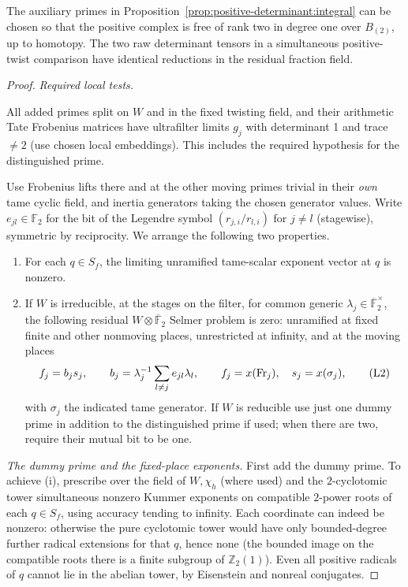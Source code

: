 \begin{lemma}\label{lem:positive-determinant:residual}
The auxiliary primes in Proposition~\ref{prop:positive-determinant:integral}
can be chosen so that the positive complex is free of rank two in degree one
over \(B_{(2)}\), up to homotopy. The two raw determinant tensors in a
simultaneous positive-twist comparison have identical reductions in the
residual fraction field.
\end{lemma}
\begin{proof}
\emph{Required local tests.}

All added primes split on \(W\) and in the fixed twisting field, and their arithmetic Tate Frobenius matrices have ultrafilter limits \(g_j\) with determinant 1 and trace \(\ne2\) (use chosen local embeddings). This includes the required hypothesis for the distinguished prime. 

Use Frobenius lifts there and at the other moving primes trivial in their \emph{own} tame cyclic field, and inertia generators taking the chosen generator values. Write \(e_{jl}\in\mathbb F_2\) for the bit of the Legendre symbol \((r_{j,i}/r_{l,i})\) for \(j\ne l\) (stagewise), symmetric by reciprocity. We arrange the following two properties.
\begin{enumerate}[label=(\roman*)]
\item For each \(q\in S_f\), the limiting unramified tame-scalar exponent vector at \(q\) is nonzero.
\item If \(W\) is irreducible, at the stages on the filter, for common generic \(\lambda_j\in\overline{\mathbb F}_2^\times\), the following residual \(W\otimes\overline{\mathbb F}_2\) Selmer problem is zero: unramified at fixed finite and other nonmoving places, unrestricted at infinity, and at the moving places
\[
             f_j=b_j s_j,\qquad b_j=\lambda_j^{-1}\sum_{l\ne j}e_{jl}\lambda_l ,
             \qquad f_j=x({\rm Fr}_j),\quad s_j=x(\sigma_j),       \tag{L2}\label{eq:L2}
\]
with \(\sigma_j\) the indicated tame generator. If \(W\) is reducible use just one dummy prime in addition to the distinguished prime if used; when there are two, require their mutual bit to be one.
\end{enumerate}

\emph{The dummy prime and the fixed-place exponents.}
First add the dummy prime. To achieve (i), prescribe over the field of \(W,\chi_h\) (where used) and the \(2\)-cyclotomic tower simultaneous nonzero Kummer exponents on compatible \(2\)-power roots of each \(q\in S_f\), using accuracy tending to infinity. Each coordinate can indeed be nonzero: otherwise the pure cyclotomic tower would have only bounded-degree further radical extensions for that \(q\), hence none (the bounded image on the compatible roots there is a finite subgroup of \(\mathbb Z_2(1)\)). Even all positive radicals of \(q\) cannot lie in the abelian tower, by Eisenstein and nonreal conjugates. 


\end{proof}
